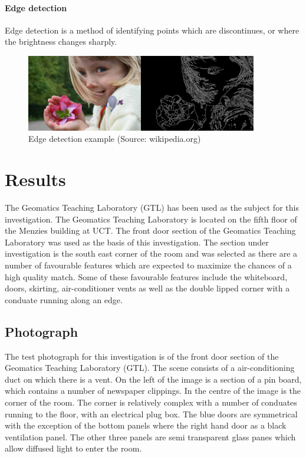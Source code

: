\documentclass[11pt,a4paper]{report}
\begin{document}
			\subsubsection{Edge detection}
				Edge detection is a method of identifying points which are discontinues, or where the brightness changes sharply.
				\begin{figure}[H]
					\centering
					\includegraphics[width=0.9\textwidth]{edge_detection}
					\caption{Edge detection example (Source: wikipedia.org)}
					\label{fig:edge_detection}
				\end{figure}

\chapter{Results}
	The Geomatics Teaching Laboratory (GTL) has been used as the subject for this investigation. The Geomatics Teaching Laboratory is located on the fifth floor of the Menzies building at UCT. The front door section of the Geomatics Teaching Laboratory was used as the basis of this investigation. The section under investigation is the south east corner of the room and was selected as there are a number of favourable features which are expected to maximize the chances of a high quality match. Some of these favourable features include the whiteboard, doors, skirting, air-conditioner vents as well as the double lipped corner with a conduate running along an edge.
	
	
	\section{Photograph}
		The test photograph for this investigation is of the front door section of the Geomatics Teaching Laboratory (GTL). The scene consists of a air-conditioning duct on which there is a vent. On the left of the image is a section of a pin board, which contains a number of newspaper clippings. In the centre of the image is the corner of the room. The corner is relatively complex with a number of conduates running to the floor, with an electrical plug box. The blue doors are symmetrical with the exception of the bottom panels where the right hand door as a black ventilation panel. The other three panels are semi transparent glass panes which allow diffused light to enter the room.
		
\end{document}
